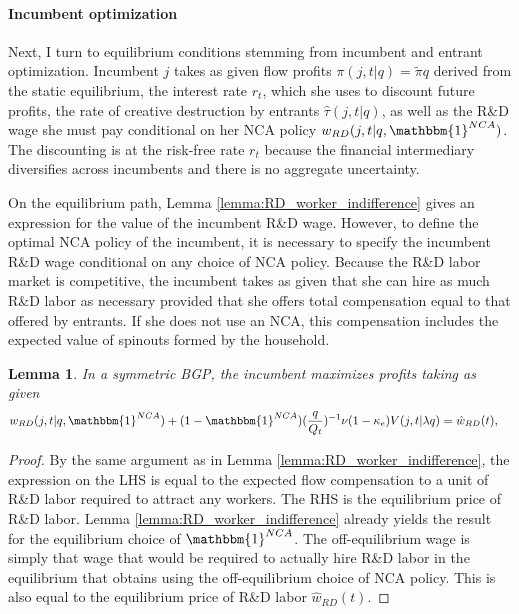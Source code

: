 \documentclass[11pt,english]{article}
\newtheorem{lemma}{Lemma}
\theoremstyle{definition}
\begin{document}
\paragraph{Incumbent optimization}

Next, I turn to equilibrium conditions stemming from incumbent and entrant optimization. Incumbent $j$ takes as given flow profits $\pi(j,t|q) = \tilde{\pi} q$ derived from the static equilibrium, the interest rate $r_t$, which she uses to discount future profits, the rate of creative destruction by entrants $\hat{\tau}(j,t|q)$, as well as the R\&D wage she must pay conditional on her NCA policy $w_{RD}(j,t|q , \mathbbm{1}^{NCA})$. The discounting is at the risk-free rate $r_t$ because the financial intermediary diversifies across incumbents and there is no aggregate uncertainty. 

On the equilibrium path, Lemma \ref{lemma:RD_worker_indifference} gives an expression for the value of the incumbent R\&D wage. However, to define the optimal NCA policy of the incumbent, it is necessary to specify the incumbent R\&D wage conditional on any choice of NCA policy. Because the R\&D labor market is competitive, the incumbent takes as given that she can hire as much R\&D labor as necessary provided that she offers total compensation equal to that offered by entrants. If she does not use an NCA, this compensation includes the expected value of spinouts formed by the household. 

\begin{lemma}\label{lemma:RD_worker_indifference1}
	In a symmetric BGP, the incumbent maximizes profits taking as given 
	\begin{align*}
		w_{RD}(j,t| q , \mathbbm{1}^{NCA}) + (1-\mathbbm{1}^{NCA}) (\frac{q}{Q_t})^{-1} \nu (1-\kappa_e) V(j,t|\lambda q) &= \hat{w}_{RD}(t),
	\end{align*}
\end{lemma}

\begin{proof}
	By the same argument as in Lemma \ref{lemma:RD_worker_indifference}, the expression on the LHS is equal to the expected flow compensation to a unit of R\&D labor required to attract any workers. The RHS is the equilibrium price of R\&D labor. Lemma \ref{lemma:RD_worker_indifference} already yields the result for the equilibrium choice of $\mathbbm{1}^{NCA}$. The off-equilibrium wage is simply that wage that would be required to actually hire R\&D labor in the equilibrium that obtains using the off-equilibrium choice of NCA policy. This is also equal to the equilibrium price of R\&D labor $\hat{w}_{RD}(t)$.  
\end{proof}
\end{document}
